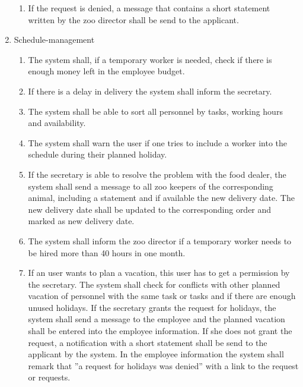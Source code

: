 \begin{enumerate}[1.]
\begin{enumerate}[1.]
	\item If the request is denied, a message that contains a short statement written by the zoo director shall be send to the applicant.
\end{enumerate}
\item Schedule-management
	\begin{enumerate}[1.]
		\item The system shall, if a temporary worker is needed, check if there is enough money left in the employee budget. 
		\item If there is a delay in delivery the system shall inform the secretary.
		\item The system shall be able to sort all personnel by tasks, working hours and availability.
		\item The system shall warn the user if one tries to include a worker into the schedule during their planned holiday.
		\item If the secretary is able to resolve the problem with the food dealer, the system shall send a message to all zoo keepers of the corresponding animal, including a statement and if available the new delivery date. The new delivery date shall be updated to the corresponding order and marked as new delivery date.
		\item The system shall inform the zoo director if a temporary worker needs to be hired more than 40 hours in one month.
		\item If an user wants to plan a vacation, this user has to get a permission by the secretary. The system shall check for conflicts with other planned vacation of personnel with the same task or tasks and if there are enough unused holidays. If the secretary grants the request for holidays, the system shall send a message to the employee and the planned vacation shall be entered into the employee information. If she does not grant the request, a notification with a short statement shall be send to the applicant by the system. In the employee information the system shall remark that ”a request for holidays was denied” with a link to the request or requests.
\end{enumerate}
\end{enumerate}
